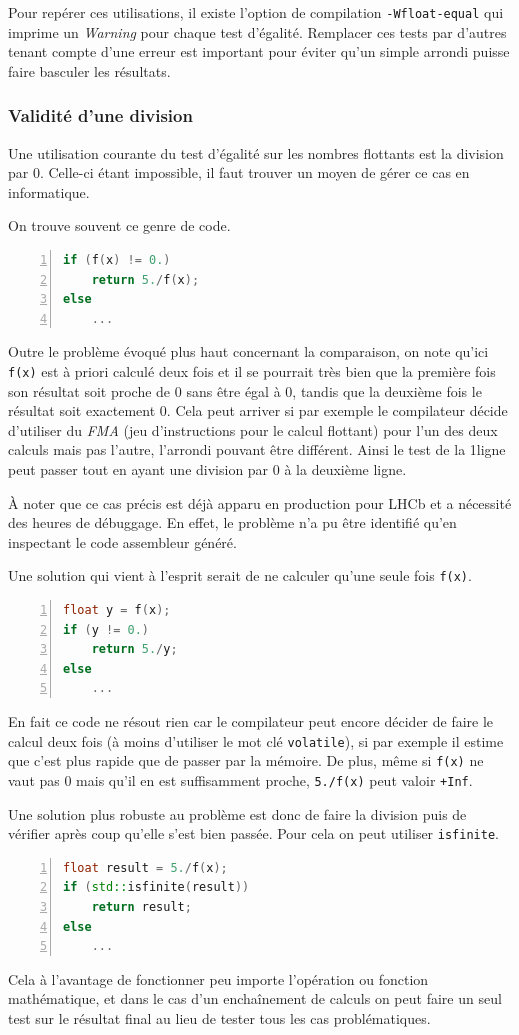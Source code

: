 \documentclass[a4paper,11pt]{report}
\begin{document}
Pour repérer ces utilisations, il existe l'option de compilation \verb'-Wfloat-equal' qui imprime un \emph{Warning} pour chaque test d'égalité.
Remplacer ces tests par d'autres tenant compte d'une erreur est important pour éviter qu'un simple arrondi puisse faire basculer les résultats.

\subsubsection{Validité d'une division}
Une utilisation courante du test d'égalité sur les nombres flottants est la division par 0.
Celle-ci étant impossible, il faut trouver un moyen de gérer ce cas en informatique.

On trouve souvent ce genre de code.
\begin{lstlisting}[language=c++,numbers=left]
if (f(x) != 0.)
    return 5./f(x);
else
    ...
\end{lstlisting}
Outre le problème évoqué plus haut concernant la comparaison, on note qu'ici \verb'f(x)' est à priori calculé deux fois et il se pourrait très bien que la première fois son résultat soit proche de 0 sans être égal à 0, tandis que la deuxième fois le résultat soit exactement 0.
Cela peut arriver si par exemple le compilateur décide d'utiliser du \emph{FMA} (jeu d'instructions pour le calcul flottant) pour l'un des deux calculs mais pas l'autre, l'arrondi pouvant être différent.
Ainsi le test de la 1\iere ligne peut passer tout en ayant une division par 0 à la deuxième ligne.

À noter que ce cas précis est déjà apparu en production pour LHCb et a nécessité des heures de débuggage.
En effet, le problème n'a pu être identifié qu'en inspectant le code assembleur généré.

Une solution qui vient à l'esprit serait de ne calculer qu'une seule fois \verb'f(x)'.
\begin{lstlisting}[language=c++,numbers=left]
float y = f(x);
if (y != 0.)
    return 5./y;
else
    ...
\end{lstlisting}
En fait ce code ne résout rien car le compilateur peut encore décider de faire le calcul deux fois (à moins d'utiliser le mot clé \verb'volatile'), si par exemple il estime que c'est plus rapide que de passer par la mémoire.
De plus, même si \verb'f(x)' ne vaut pas 0 mais qu'il en est suffisamment proche, \verb'5./f(x)' peut valoir \verb'+Inf'.

Une solution plus robuste au problème est donc de faire la division puis de vérifier après coup qu'elle s'est bien passée.
Pour cela on peut utiliser \verb'isfinite'.
\begin{lstlisting}[language=c++,numbers=left]
float result = 5./f(x);
if (std::isfinite(result))
    return result;
else
    ...
\end{lstlisting}
Cela à l'avantage de fonctionner peu importe l'opération ou fonction mathématique, et dans le cas d'un enchaînement de calculs on peut faire un seul test sur le résultat final au lieu de tester tous les cas problématiques.
\end{document}
